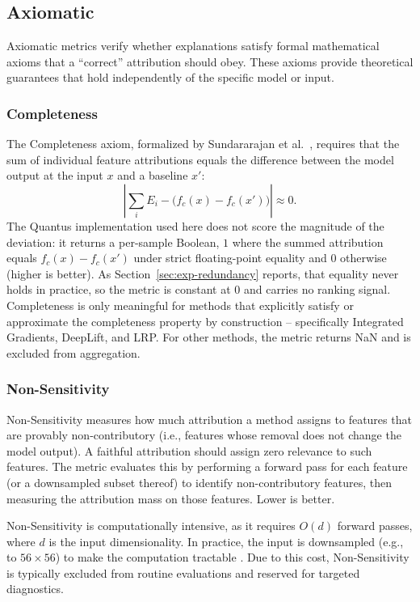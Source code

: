 \subsection{Axiomatic}
\label{subsec:axiomatic}
Axiomatic metrics verify whether explanations satisfy formal mathematical axioms that a ``correct'' attribution should obey. These axioms provide theoretical guarantees that hold independently of the specific model or input.

\subsubsection{Completeness}
The Completeness axiom, formalized by Sundararajan et al.\ \cite{sundararajan2017axiomatic}, requires that the sum of individual feature attributions equals the difference between the model output at the input $x$ and a baseline $x'$:
\begin{equation}
    \left|\sum_{i} E_i - \bigl(f_c(x) - f_c(x')\bigr)\right| \approx 0.
\end{equation}
The Quantus implementation used here does not score the magnitude of the deviation: it returns a per-sample Boolean, $1$ where the summed attribution equals $f_c(x) - f_c(x')$ under strict floating-point equality and $0$ otherwise (higher is better). As Section~\ref{sec:exp-redundancy} reports, that equality never holds in practice, so the metric is constant at $0$ and carries no ranking signal. Completeness is only meaningful for methods that explicitly satisfy or approximate the completeness property by construction -- specifically Integrated Gradients, DeepLift, and LRP. For other methods, the metric returns NaN and is excluded from aggregation.

\subsubsection{Non-Sensitivity}
Non-Sensitivity measures how much attribution a method assigns to features that are provably non-contributory (i.e., features whose removal does not change the model output). A faithful attribution should assign zero relevance to such features. The metric evaluates this by performing a forward pass for each feature (or a downsampled subset thereof) to identify non-contributory features, then measuring the attribution mass on those features. Lower is better.

Non-Sensitivity is computationally intensive, as it requires $O(d)$ forward passes, where $d$ is the input dimensionality. In practice, the input is downsampled (e.g., to $56 \times 56$) to make the computation tractable \cite{hedstrom2023quantus}. Due to this cost, Non-Sensitivity is typically excluded from routine evaluations and reserved for targeted diagnostics.

